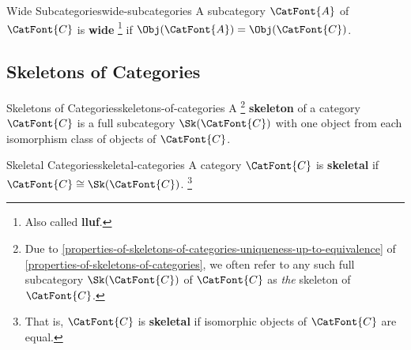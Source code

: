\begin{definition}{Wide Subcategories}{wide-subcategories}%
    A subcategory $\CatFont{A}$ of $\CatFont{C}$ is \textbf{wide}%
    \footnote{%
        Also called \textbf{lluf}.
        \par\vspace*{-1.75\baselineskip}
    } %
    if $\Obj(\CatFont{A})=\Obj(\CatFont{C})$.
\end{definition}
\subsection{Skeletons of Categories}\label{subsection-skeletons-of-categories}
\begin{definition}{Skeletons of Categories}{skeletons-of-categories}%
    A%
    \footnote{%
        Due to \cref{properties-of-skeletons-of-categories-uniqueness-up-to-equivalence} of \cref{properties-of-skeletons-of-categories}, we often refer to any such full subcategory $\Sk(\CatFont{C})$ of $\CatFont{C}$ as \emph{the} skeleton of $\CatFont{C}$.
        \par\vspace*{-1.75\baselineskip}
    } %
    \textbf{skeleton} of a category $\CatFont{C}$ is a full subcategory $\Sk(\CatFont{C})$ with one object from each isomorphism class of objects of $\CatFont{C}$.
\end{definition}
\begin{definition}{Skeletal Categories}{skeletal-categories}%
    A category $\CatFont{C}$ is \textbf{skeletal} if $\CatFont{C}\cong\Sk(\CatFont{C})$.%
    \footnote{%
        That is, $\CatFont{C}$ is \textbf{skeletal} if isomorphic objects of $\CatFont{C}$ are equal.
        \par\vspace*{-1.75\baselineskip}
    }%
\end{definition}
